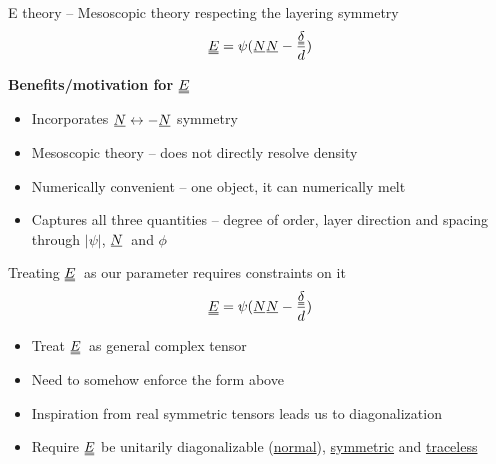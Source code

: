 \documentclass[10pt,mathserif]{beamer}
\newcommand{\suf}[2]{\stackunder[0.5pt]{\stackunder[1pt]{\ensuremath{#1}}{\rule{\widthof{\ensuremath{#2}}*\real{0.9}}{.1ex}}}{}}
\newcommand{\duf}[2]{\stackunder[0.5pt]{\stackunder[0.8pt]{\stackunder[1pt]{\ensuremath{#1}}{\rule{\widthof{\ensuremath{#2}}*\real{0.9}}{.1ex}}}{\rule{\widthof{\ensuremath{#2}}*\real{0.9}}{.1ex}}}{}}
\newcommand{\su}[1]{\suf{#1}{#1}}
\newcommand{\du}[1]{\duf{#1}{#1}}
\newcommand{\NN}{\ensuremath{\su{N}}}
\newcommand{\EE}{\ensuremath{\du{E}}}
\newcommand{\subheading}[1]{\large\textbf{#1}\normalsize}
\begin{document}
\begin{frame}[fragile]{E theory -- Mesoscopic theory respecting the layering symmetry}
    \newrefsection
    \vspace{-\fill}
    \begin{equation*}
        \du{E} = \psi(\su{N}\su{N} - \frac{\du{\delta}}{d})
    \end{equation*}
    \vfill

    \subheading{Benefits/motivation for \EE}
    \begin{itemize}
        \item Incorporates $\NN\leftrightarrow-\NN$ symmetry
        \item Mesoscopic theory -- does not directly resolve density
        \item Numerically convenient -- one object, it can numerically melt
        \item Captures all three quantities -- degree of order, layer direction and spacing through $|\psi|$, \NN\ and $\phi$
    \end{itemize}
\end{frame}

\begin{frame}[fragile]{Treating \EE\ as our parameter requires constraints on it}
    \newrefsection
    \vspace{-\fill}
    \begin{equation*}
        \du{E} = \psi(\su{N}\su{N} - \frac{\du{\delta}}{d})
    \end{equation*}
    \vfill

    \begin{itemize}
        \item Treat \EE\ as general complex tensor
        \item Need to somehow enforce the form above
        \item Inspiration from real symmetric tensors leads us to diagonalization
        \item Require $\du{E}$ be unitarily diagonalizable (\underline{normal}), \underline{symmetric} and \underline{traceless}
    \end{itemize}
\end{frame}
\end{document}
